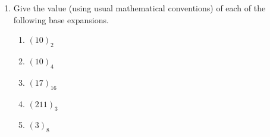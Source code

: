 \documentclass[12pt, oneside]{article}
\begin{document}
\begin{enumerate}
{ }
    \item {

Give the value (using usual mathematical conventions) of 
each of the following base expansions.
\begin{enumerate}
    \item $(10)_{2}$
    \item $(10)_{4}$
    \item $(17)_{16}$
    \item $(211)_{3}$
    \item $(3)_{8}$
\end{enumerate} }
\end{enumerate}
\end{document}
